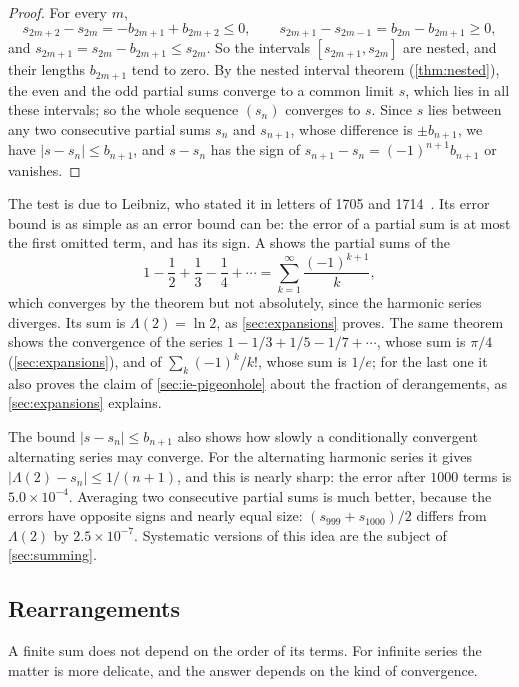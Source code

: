 \begin{proof}
For every $m$,
\[
s_{2m+2}-s_{2m}=-b_{2m+1}+b_{2m+2}\le0,\qquad s_{2m+1}-s_{2m-1}=b_{2m}-b_{2m+1}\ge0,
\]
and $s_{2m+1}=s_{2m}-b_{2m+1}\le s_{2m}$. So the intervals $[s_{2m+1},s_{2m}]$ are nested, and their lengths $b_{2m+1}$ tend to zero. By the nested interval theorem (\cref{thm:nested}), the even and the odd partial sums converge to a common limit $s$, which lies in all these intervals; so the whole sequence $(s_n)$ converges to $s$. Since $s$ lies between any two consecutive partial sums $s_n$ and $s_{n+1}$, whose difference is $\pm b_{n+1}$, we have $|s-s_n|\le b_{n+1}$, and $s-s_n$ has the sign of $s_{n+1}-s_n=(-1)^{n+1}b_{n+1}$ or vanishes.
\end{proof}

The test is due to Leibniz, who stated it in letters of 1705 and 1714~\cite{knopp1990}. Its error bound is as simple as an error bound can be: the error of a partial sum is at most the first omitted term, and has its sign. A shows the partial sums of the 
\[
1-\frac12+\frac13-\frac14+\cdots=\sum_{k=1}^\infty\frac{(-1)^{k+1}}k ,
\]
which converges by the theorem but not absolutely, since the harmonic series diverges. Its sum is $\Lambda(2)=\ln2$, as \cref{sec:expansions} proves. The same theorem shows the convergence of the series $1-1/3+1/5-1/7+\cdots$, whose sum is $\pi/4$ (\cref{sec:expansions}), and of $\sum_k(-1)^k/k!$, whose sum is $1/e$; for the last one it also proves the claim of \cref{sec:ie-pigeonhole} about the fraction of derangements, as \cref{sec:expansions} explains.

The bound $|s-s_n|\le b_{n+1}$ also shows how slowly a conditionally convergent alternating series may converge. For the alternating harmonic series it gives $|\Lambda(2)-s_n|\le1/(n+1)$, and this is nearly sharp: the error after $1000$ terms is $5.0\times10^{-4}$. Averaging two consecutive partial sums is much better, because the errors have opposite signs and nearly equal size: $(s_{999}+s_{1000})/2$ differs from $\Lambda(2)$ by $2.5\times10^{-7}$. Systematic versions of this idea are the subject of \cref{sec:summing}.

\subsection{Rearrangements}

A finite sum does not depend on the order of its terms. For infinite series the matter is more delicate, and the answer depends on the kind of convergence.

